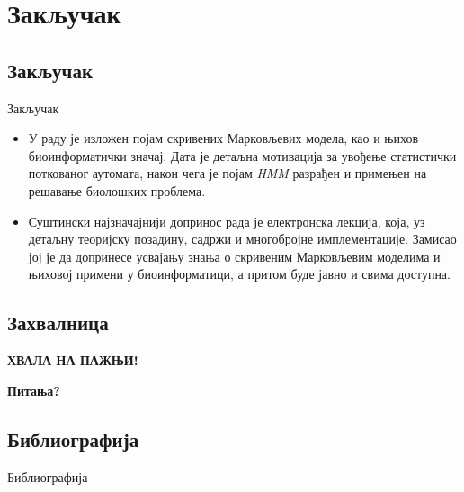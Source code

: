 \documentclass[hyperref={bookmarks=false}]{beamer}
\begin{document}
\section{Закључак}
\subsection{Закључак}
\begin{frame}{Закључак}
\begin{itemize}
\item У раду је изложен појам скривених Марковљевих модела, као и њихов биоинформатички значај. Дата је детаљна мотивација за увођење статистички поткованог аутомата, након чега је појам \textit{HMM} разрађен и примењен на решавање биолошких проблема.
\item Суштински најзначајнији допринос рада је електронска лекција, која, уз детаљну теоријску позадину, садржи и многобројне имплементације. Замисао јој је да допринесе усвајању знања о скривеним Марковљевим моделима и њиховој примени у биоинформатици, а притом буде јавно и свима доступна.
\end{itemize}
\end{frame}

\subsection{Захвалница}
\begin{frame}
\centering \LARGE
\textbf{ХВАЛА НА ПАЖЊИ!}

\textbf{Питања?}
\end{frame}

\subsection{Библиографија}
\begin{frame}{Библиографија}
\nocite{*}


\end{frame}
\end{document}
